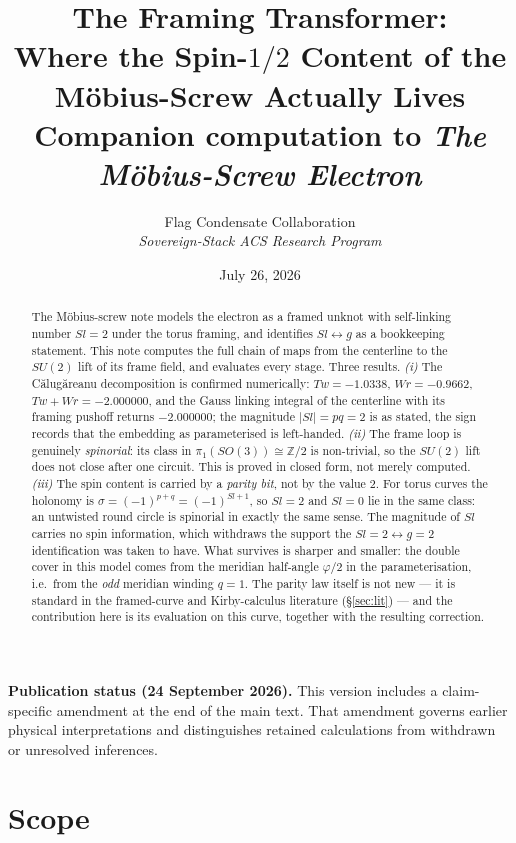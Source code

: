 \documentclass[11pt,a4paper]{article}
\title{\textbf{The Framing Transformer:\\
Where the Spin-$1/2$ Content of the M\"obius-Screw Actually Lives}\\[0.35em]
\large Companion computation to \textit{The M\"obius-Screw Electron}}
\author{Flag Condensate Collaboration\\
\small\textit{Sovereign-Stack ACS Research Program}}
\date{July 26, 2026}
\begin{document}
\maketitle

\begin{abstract}
The M\"obius-screw note models the electron as a framed unknot with
self-linking number $Sl=2$ under the torus framing, and identifies
$Sl \leftrightarrow g$ as a bookkeeping statement.  This note computes
the full chain of maps from the centerline to the $SU(2)$ lift of its
frame field, and evaluates every stage.  Three results.
\emph{(i)} The C\u{a}lug\u{a}reanu decomposition is confirmed
numerically: $Tw = -1.0338$, $Wr = -0.9662$, $Tw+Wr = -2.000000$, and the
Gauss linking integral of the centerline with its framing pushoff returns
$-2.000000$; the magnitude $|Sl| = pq = 2$ is as stated, the sign records
that the embedding as parameterised is left-handed.
\emph{(ii)} The frame loop is genuinely \emph{spinorial}: its class in
$\pi_1(SO(3)) \cong \mathbb{Z}/2$ is non-trivial, so the $SU(2)$ lift
does not close after one circuit.  This is proved in closed form, not
merely computed.
\emph{(iii)} The spin content is carried by a \emph{parity bit}, not by
the value $2$.  For torus curves the holonomy is
$\sigma = (-1)^{p+q} = (-1)^{Sl+1}$, so $Sl = 2$ and $Sl = 0$ lie in the
same class: an untwisted round circle is spinorial in exactly the same
sense.  The magnitude of $Sl$ carries no spin information, which
withdraws the support the $Sl=2 \leftrightarrow g=2$ identification was
taken to have.  What survives is sharper and smaller: the double cover in
this model comes from the meridian half-angle $\varphi/2$ in the
parameterisation, i.e.\ from the \emph{odd} meridian winding $q=1$.
The parity law itself is not new --- it is standard in the framed-curve
and Kirby-calculus literature (\S\ref{sec:lit}) --- and the contribution
here is its evaluation on this curve, together with the resulting
correction.
\end{abstract}
\par\smallskip\noindent\textbf{Publication status (24 September 2026).}
This version includes a claim-specific amendment at the end of the main text.
That amendment governs earlier physical interpretations and distinguishes
retained calculations from withdrawn or unresolved inferences.\par\smallskip


\tableofcontents
\newpage

\section{Scope}
\end{document}
